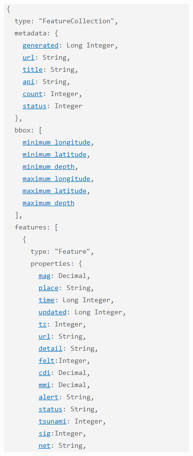 \begin{figure}[H]
	\centering
	\includegraphics[scale = 0.3]{attachment/chapter_3/Scc074}
\end{figure}

